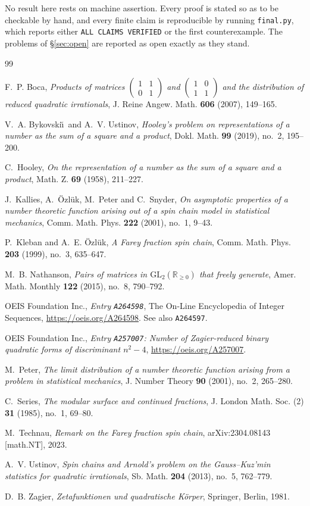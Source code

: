 \documentclass[11pt,reqno]{amsart}
\theoremstyle{plain}
\theoremstyle{definition}
\newcommand{\GL}{\mathrm{GL}}
\newcommand{\sqm}[4]{\left(\begin{smallmatrix}#1&#2\\#3&#4\end{smallmatrix}\right)}
\begin{document}
No result here rests on machine assertion. Every proof is stated so as to be checkable by hand, and
every finite claim is reproducible by running \texttt{final.py}, which reports either
\texttt{ALL CLAIMS VERIFIED} or the first counterexample. The problems of \S\ref{sec:open} are
reported as open exactly as they stand.

\begin{thebibliography}{99}

 F.~P. Boca,
\emph{Products of matrices $\sqm{1}{1}{0}{1}$ and $\sqm{1}{0}{1}{1}$ and the
distribution of reduced quadratic irrationals},
J. Reine Angew. Math. \textbf{606} (2007), 149--165.

 V.~A. Bykovski\u\i\ and A.~V. Ustinov,
\emph{Hooley's problem on representations of a number as the sum of a square and a
product}, Dokl. Math. \textbf{99} (2019), no.~2, 195--200.

 C.~Hooley,
\emph{On the representation of a number as the sum of a square and a product},
Math. Z. \textbf{69} (1958), 211--227.

 J.~Kallies, A.~\"Ozl\"uk, M.~Peter and C.~Snyder,
\emph{On asymptotic properties of a number theoretic function arising out of a spin
chain model in statistical mechanics},
Comm. Math. Phys. \textbf{222} (2001), no.~1, 9--43.

 P.~Kleban and A.~E. \"Ozl\"uk,
\emph{A Farey fraction spin chain},
Comm. Math. Phys. \textbf{203} (1999), no.~3, 635--647.

 M.~B. Nathanson,
\emph{Pairs of matrices in $\GL_2(\mathbb{R}_{\ge0})$ that freely generate},
Amer. Math. Monthly \textbf{122} (2015), no.~8, 790--792.

 OEIS Foundation Inc.,
\emph{Entry \texttt{A264598}}, The On-Line Encyclopedia of Integer Sequences,
\url{https://oeis.org/A264598}. See also \texttt{A264597}.

 OEIS Foundation Inc.,
\emph{Entry \texttt{A257007}: Number of Zagier-reduced binary quadratic forms of
discriminant $n^2-4$}, \url{https://oeis.org/A257007}.

 M.~Peter,
\emph{The limit distribution of a number theoretic function arising from a problem in
statistical mechanics}, J. Number Theory \textbf{90} (2001), no.~2, 265--280.

 C.~Series,
\emph{The modular surface and continued fractions},
J. London Math. Soc. (2) \textbf{31} (1985), no.~1, 69--80.

 M.~Technau,
\emph{Remark on the Farey fraction spin chain},
arXiv:2304.08143 [math.NT], 2023.

 A.~V. Ustinov,
\emph{Spin chains and Arnold's problem on the Gauss--Kuz'min statistics for quadratic
irrationals}, Sb. Math. \textbf{204} (2013), no.~5, 762--779.

 D.~B. Zagier,
\emph{Zetafunktionen und quadratische K\"orper}, Springer, Berlin, 1981.

\end{thebibliography}
\end{document}
